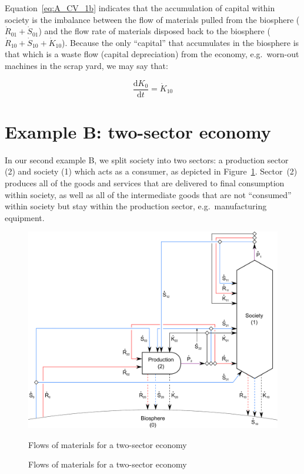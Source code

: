 Equation~\ref{eq:A_CV_1b} indicates that the accumulation 
of capital
within society is the imbalance 
between the flow of materials pulled from the biosphere
($\dot{R}_{01} + \dot{S}_{01}$) and the 
flow rate of materials disposed back to the biosphere 
($\dot{R}_{10} + \dot{S}_{10} + \dot{K}_{10}$). 
Because the only ``capital'' that accumulates in the biosphere
is that which is a waste flow (capital depreciation)
from the economy, e.g.\ worn-out machines in the scrap yard, we may say that:

\begin{equation} \label{eq:A_K0_balance}
	\frac{\mathrm{d}K_{0}}{\mathrm{d}t}		
	= \dot{K}_{10}
\end{equation}


\section{Example B: two-sector economy} %
\label{sec:B_materials}

In our second example B, we split society into two sectors: 
a production sector (2) and society (1) which acts as a consumer, 
as depicted in Figure~\ref{fig:B_materials}. 
Sector~(2) produces all of the goods and services 
that are delivered to final consumption within society, 
as well as all of the intermediate goods that are not ``consumed'' 
within society but stay within the production sector, e.g.\ manufacturing equipment.

\begin{figure}[!ht]
\centering
\includegraphics[width=0.8\linewidth]{Part_1/Chapter_Materials/images/2_sector_materials.pdf}
\caption{Flows of materials for a two-sector economy}{Flows of materials for a two-sector economy}
\label{fig:B_materials}
\end{figure}

